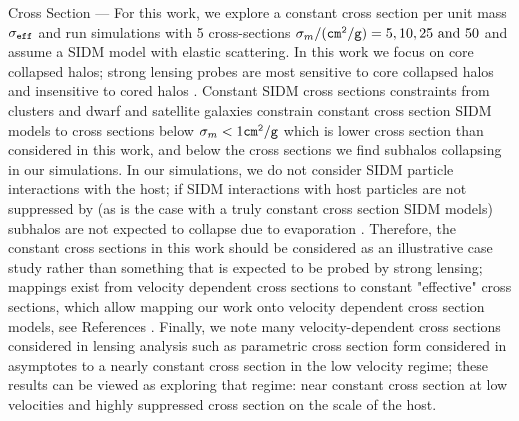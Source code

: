 \documentclass[%
 reprint,
 amsmath,
 amssymb,
 aps,
]{revtex4-2}
\begin{document}
Cross Section --- 
For this work, we explore a constant cross section per unit mass $\sigma_{\tt eff}$ and run simulations with 5 cross-sections $\sigma_m / ({\tt cm^2 / g}) = 5, 10, 25 \text{ and }50$ and assume a SIDM model with elastic scattering. 
In this work we focus on core collapsed halos; strong lensing probes are most sensitive to core collapsed halos and insensitive to cored halos \cite{gilman2021strong}.  
Constant SIDM cross sections constraints from clusters \cite{eckert2022constraints,sagunski2021velocity,andrade2022stringent} and dwarf and satellite galaxies \cite{ando2025stringent, correa2021constraining} constrain constant cross section SIDM models to cross sections below $\sigma_m < 1 {\tt cm^2 / g }$ which is lower cross section than considered in this work, and below the cross sections we find subhalos collapsing in our simulations.
In our simulations, we do not consider SIDM particle interactions with the host; if SIDM interactions with host particles are not suppressed by (as is the case with a truly constant cross section SIDM models) subhalos are not expected to collapse due to evaporation \cite{zeng2022core}. 
Therefore, the constant cross sections in this work should be considered as an illustrative case study rather than something that is expected to be probed by strong lensing; mappings exist from velocity dependent cross sections to constant "effective" cross sections, which allow mapping our work onto velocity dependent cross section models, see References \cite{yang2022gravothermal, yang2023gravothermal, outmezguine2023universal}.
Finally, we note many velocity-dependent cross sections considered in lensing analysis such as parametric cross section form considered in \cite{gilman2021strong} asymptotes to a nearly constant cross section in the low velocity regime; these results can be viewed as exploring that regime: near constant cross section at low velocities and highly suppressed cross section on the scale of the host. 
\end{document}
